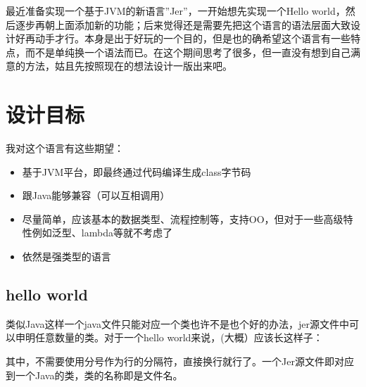 \documentclass[12pt]{article}
\begin{document}
\makeblogtitle

最近准备实现一个基于JVM的新语言''Jer''，一开始想先实现一个Hello world，然后逐步再朝上面添加新的功能；后来觉得还是需要先把这个语言的语法层面大致设计好再动手才行。本身是出于好玩的一个目的，但是也的确希望这个语言有一些特点，而不是单纯换一个语法而已。在这个期间思考了很多，但一直没有想到自己满意的方法，姑且先按照现在的想法设计一版出来吧。

\section{设计目标}\label{ux8bbeux8ba1ux76eeux6807}

我对这个语言有这些期望：

\begin{itemize}
\tightlist
\item
  基于JVM平台，即最终通过代码编译生成class字节码
\item
  跟Java能够兼容（可以互相调用）
\item
  尽量简单，应该基本的数据类型、流程控制等，支持OO，但对于一些高级特性例如泛型、lambda等就不考虑了
\item
  依然是强类型的语言
\end{itemize}

\subsection{hello world}\label{hello-world}

类似Java这样一个java文件只能对应一个类也许不是也个好的办法，jer源文件中可以申明任意数量的类。对于一个hello world来说，(大概）应该长这样子：

\begin{Shaded}
\begin{Highlighting}[]
\OperatorTok{/}\OperatorTok{/}

\OperatorTok{:}\NormalTok{ [}\NormalTok{) }\OperatorTok{=} \OperatorTok{\{}
\OperatorTok{:}  \OperatorTok{=} 
\OperatorTok{\}}
\end{Highlighting}
\end{Shaded}

其中，不需要使用分号作为行的分隔符，直接换行就行了。一个Jer源文件即对应到一个Java的类，类的名称即是文件名。
\end{document}
